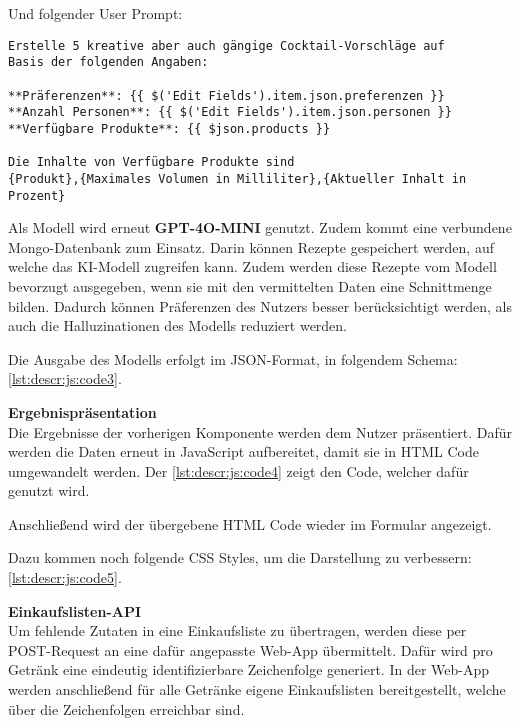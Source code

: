 Und folgender User Prompt:
\begin{verbatim}
Erstelle 5 kreative aber auch gängige Cocktail-Vorschläge auf
Basis der folgenden Angaben:

**Präferenzen**: {{ $('Edit Fields').item.json.preferenzen }}
**Anzahl Personen**: {{ $('Edit Fields').item.json.personen }}
**Verfügbare Produkte**: {{ $json.products }}

Die Inhalte von Verfügbare Produkte sind
{Produkt},{Maximales Volumen in Milliliter},{Aktueller Inhalt in Prozent}
\end{verbatim}

Als Modell wird erneut \textbf{GPT-4O-MINI} genutzt.
Zudem kommt eine verbundene Mongo-Datenbank zum Einsatz. Darin können Rezepte gespeichert werden,
auf welche das KI-Modell zugreifen kann. Zudem werden diese Rezepte vom Modell bevorzugt ausgegeben,
wenn sie mit den vermittelten Daten eine Schnittmenge bilden. Dadurch können Präferenzen des Nutzers
besser berücksichtigt werden, als auch die Halluzinationen des Modells reduziert werden.

Die Ausgabe des Modells erfolgt im JSON-Format, in folgendem Schema: \autoref{lst:descr:js:code3}.

\textbf{Ergebnispräsentation} \\
Die Ergebnisse der vorherigen Komponente werden dem Nutzer präsentiert. Dafür werden die Daten
erneut in JavaScript aufbereitet, damit sie in HTML Code umgewandelt werden. Der
\autoref{lst:descr:js:code4} zeigt den Code, welcher dafür genutzt wird.

Anschließend wird der übergebene HTML Code wieder im Formular angezeigt.

Dazu kommen noch folgende CSS Styles, um die Darstellung zu verbessern: \autoref{lst:descr:js:code5}.

\textbf{Einkaufslisten-API} \\
Um fehlende Zutaten in eine Einkaufsliste zu übertragen, werden diese per POST-Request an eine dafür
angepasste Web-App übermittelt. Dafür wird pro Getränk eine eindeutig identifizierbare Zeichenfolge
generiert. In der Web-App werden anschließend für alle Getränke eigene Einkaufslisten
bereitgestellt, welche über die Zeichenfolgen erreichbar sind.
